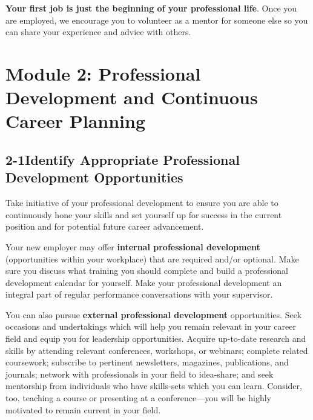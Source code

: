 \textbf{Your first job is just the beginning of your professional life}. Once you are employed, we encourage you to volunteer as a mentor for someone else so you can share your experience and advice with others.
 
 
\pagebreak \section*{Module 2: Professional Development and Continuous Career Planning}
\noindent\makebox[\textwidth]{\rule{\linewidth}{0.4pt}}  \localtableofcontents 
\noindent\makebox[\textwidth]{\rule{\linewidth}{0.4pt}} 

\pagebreak \subsection*{2-1\quad Identify Appropriate Professional Development Opportunities}

Take initiative of your professional development to ensure you are able to continuously hone your skills and set yourself up for success in the current position and for potential future career advancement.

Your new employer may offer \textbf{internal professional development} (opportunities within your workplace) that are required and/or optional. Make sure you discuss what training you should complete and build a professional development calendar for yourself. Make your professional development an integral part of regular performance conversations with your supervisor.

You can also pursue \textbf{external professional development} opportunities. Seek occasions and undertakings which will help you remain relevant in your career field and equip you for leadership opportunities. Acquire up-to-date research and skills by attending relevant conferences, workshops, or webinars; complete related coursework; subscribe to pertinent newsletters, magazines, publications, and journals; network with professionals in your field to idea-share; and seek mentorship from individuals who have skills-sets which you can learn. Consider, too, teaching a course or presenting at a conference—you will be highly motivated to remain current in your field.

